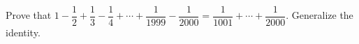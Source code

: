 Prove that $1-\dfrac{1}{2}+\dfrac{1}{3}-\dfrac{1}{4}+\cdots+\dfrac{1}{1999}-\dfrac{1}{2000}=\dfrac{1}{1001}+\cdots+\dfrac{1}{2000}$. Generalize the identity.
